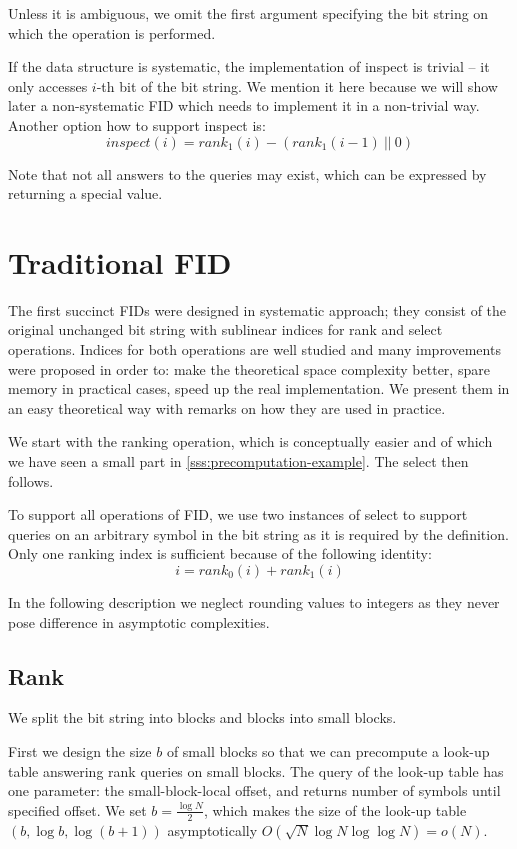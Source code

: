 Unless it is ambiguous, we omit the first argument specifying the bit string on which the operation is performed.

If the data structure is systematic, the implementation of inspect is trivial -- it only accesses $i$-th bit of the bit string.
We mention it here because we will show later a non-systematic FID which needs to implement it in a non-trivial way.
Another option how to support inspect is: $$inspect(i) = rank_1(i) - (rank_1(i-1) \ ||\ 0)$$

Note that not all answers to the queries may exist, which can be expressed by returning a special value.

\section{Traditional FID}

The first succinct FIDs were designed in systematic approach; they consist of the original unchanged bit string with sublinear indices for rank and select operations.
Indices for both operations are well studied and many improvements were proposed in order to: make the theoretical space complexity better, spare memory in practical cases, speed up the real implementation.
We present them in an easy theoretical way with remarks on how they are used in practice.

We start with the ranking operation, which is conceptually easier and of which we have seen a small part in \ref{sss:precomputation-example}.
The select then follows.

To support all operations of FID, we use two instances of select to support queries on an arbitrary symbol in the bit string as it is required by the definition.
Only one ranking index is sufficient because of the following identity:
$$ i = rank_0(i) + rank_1(i) $$

In the following description we neglect rounding values to integers as they never pose difference in asymptotic complexities.

\subsection{Rank}

We split the bit string into blocks and blocks into small blocks.

First we design the size $b$ of small blocks so that we can precompute a look-up table answering rank queries on small blocks.
The query of the look-up table has one parameter: the small-block-local offset, and returns number of symbols until specified offset.
We set $b = \frac{\log N}{2}$, which makes the size of the look-up table $(b, \log b, \log (b + 1))$ asymptotically $O(\sqrt{N} \log N \log \log N) = o(N)$.

